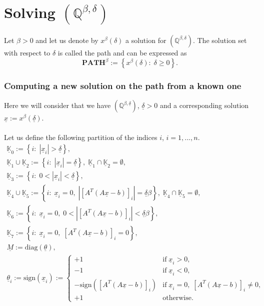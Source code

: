 \documentclass[fleqn]{report} %
\begin{document}
\section{Solving $(\mathbb{Q}^{\beta,\delta})$}
Let $\beta>0$ and let us denote by $x^{\beta}(\delta)$ a solution for $(\mathbb{Q}^{\beta,\delta})$. The solution set with respect to $\delta$ is called the path and can be expressed as 
\[
	\textbf{PATH}^{\beta}:= \left\{x^{\beta}(\delta):\;\delta\geq 0\right\}.
\] 
\subsubsection{Computing a new solution on the path from a known one}
Here we will consider that we have $(\mathbb{Q}^{\beta,\underline{\delta}})$, $\underline{\delta}>0$ and a corresponding solution $\underline{x}:=x^{\beta}(\underline{\delta})$.\\
\\
Let us define the following partition of the indices $i$, $i=1,..., n$.
\[
\begin{array}{l}
\underline{\mathbb{K}}_0:=\left\{i:\;\left|\underline{x}_i\right|>\underline{\delta} \right\},\\
\underline{\mathbb{K}}_1\cup\underline{\mathbb{K}}_2:=\left\{i:\;\left|\underline{x}_i\right|=\underline{\delta} \right\},\; \underline{\mathbb{K}}_1\cap\underline{\mathbb{K}}_2=\emptyset,\\
\underline{\mathbb{K}}_3:=\left\{i:\;0<\left|\underline{x}_i\right|<\underline{\delta} \right\},\\
\underline{\mathbb{K}}_4\cup\underline{\mathbb{K}}_5:=\left\{i:\;\underline{x}_i=0,\;\left|\left[A^T(A\underline{x} -b)\right]_i\right|=\underline{\delta} \beta\right\},\;\underline{\mathbb{K}}_4\cap\underline{\mathbb{K}}_5=\emptyset,\\
\underline{\mathbb{K}}_6:=\left\{i:\;\underline{x}_i=0,\;0<\left|\left[A^T(A\underline{x} -b)\right]_i\right|<\underline{\delta} \beta \right\},\\
\underline{\mathbb{K}}_7:=\left\{i:\;\underline{x}_i=0,\;\left[A^T(A\underline{x} -b)\right]_i=0\right\},\\
\underline{M}:=\text{diag}(\underline{\theta}),\\
\underline{\theta}_i:=\text{sign}(\underline{x}_i):=
\left\{
\begin{array}{ll}
+1& \text{if}\;\underline{x}_i >0,\\
- 1& \text{if}\;\underline{x}_i <0,\\
- \text{sign}(\left[A^T(A\underline{x} -b)\right]_i)& \text{if}\;\underline{x}_i=0,\;\left[A^T(A\underline{x} -b)\right]_i\neq0,\\
+1& \text{otherwise}.
\end{array}
\right.
\end{array} 
\]
\end{document}
